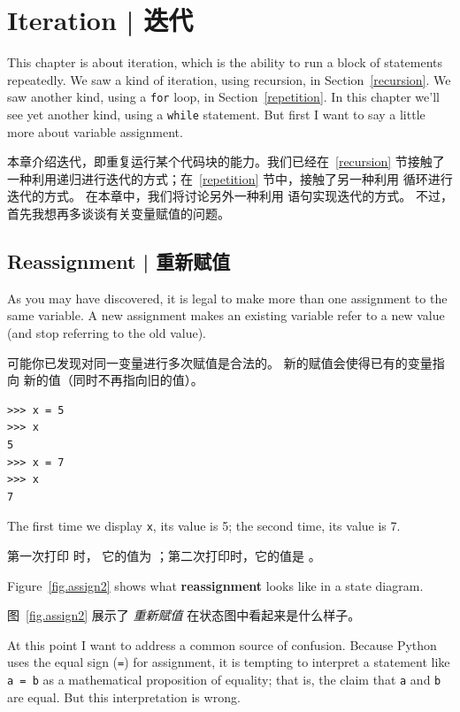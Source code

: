 

\chapter{Iteration  |  迭代}

This chapter is about iteration, which is the ability to run
a block of statements repeatedly.  We saw a kind of iteration,
using recursion, in Section~\ref{recursion}.
We saw another kind, using a {\tt for} loop,
in Section~\ref{repetition}.  In this chapter we'll see yet another
kind, using a {\tt while} statement.
But first I want to say a little more about variable assignment.

本章介绍迭代，即重复运行某个代码块的能力。我们已经在~\ref{recursion} 节接触了一种利用递归进行迭代的方式；在~\ref{repetition} 节中，接触了另一种利用  循环进行迭代的方式。 在本章中，我们将讨论另外一种利用  语句实现迭代的方式。
不过，首先我想再多谈谈有关变量赋值的问题。


\section{Reassignment  |  重新赋值}
    
    

As you may have discovered, it is legal to make more than one
assignment to the same variable.  A new assignment makes an existing
variable refer to a new value (and stop referring to the old value).

可能你已发现对同一变量进行多次赋值是合法的。 新的赋值会使得已有的变量指向
新的值（同时不再指向旧的值）。

\begin{lstlisting}
>>> x = 5
>>> x
5
>>> x = 7
>>> x
7
\end{lstlisting}

%
The first time we display
{\tt x}, its value is 5; the second time, its
value is 7.

第一次打印  时， 它的值为 ；第二次打印时，它的值是 。

Figure~\ref{fig.assign2} shows what {\bf reassignment} looks
like in a state diagram.
 

图~\ref{fig.assign2} 展示了 {\em 重新赋值} 在状态图中看起来是什么样子。
 

At this point I want to address a common source of confusion.
Because Python uses the equal sign ({\tt =}) for assignment, it is
tempting to interpret a statement like {\tt a = b} as a mathematical
proposition of equality; that is, the claim that {\tt a} and
{\tt b} are equal.  But this interpretation is wrong.

